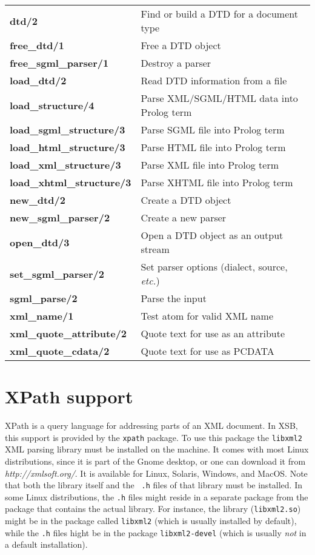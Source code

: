\begin{longtable}[l]{ll}
  {\bf dtd/2}&Find or build a DTD for a document type\\
  {\bf free\_dtd/1}&Free a DTD object\\
  {\bf free\_sgml\_parser/1}&Destroy a parser\\
  {\bf load\_dtd/2}&Read DTD information from a file\\
  {\bf load\_structure/4}&Parse XML/SGML/HTML data into Prolog term\\
  {\bf load\_sgml\_structure/3}&Parse SGML file into Prolog term \\
  {\bf load\_html\_structure/3}&Parse HTML file into Prolog term\\
  {\bf load\_xml\_structure/3}&Parse XML file into Prolog term\\
  {\bf load\_xhtml\_structure/3}&Parse XHTML file into Prolog term\\
  {\bf new\_dtd/2}&Create a DTD object\\
  {\bf new\_sgml\_parser/2}&Create a new parser\\
  {\bf open\_dtd/3}&Open a DTD object as an output stream\\
  {\bf set\_sgml\_parser/2}&Set parser options (dialect, source, \emph{etc.})\\
  {\bf sgml\_parse/2}&Parse the input\\
  {\bf xml\_name/1}&Test atom for valid XML name\\
  {\bf xml\_quote\_attribute/2}&Quote text for use as an attribute\\
  {\bf xml\_quote\_cdata/2}&Quote text for use as PCDATA\\

\end{longtable}


\section{XPath support}\label{sec-xpath}

XPath is a query language for addressing parts of an XML document.
In XSB, this support is provided by the {\tt xpath} package.
To use this package the {\tt libxml2} XML parsing library must be installed
on the machine. It comes with most Linux distributions, since it is part of
the Gnome desktop, or one can download
it from \emph{http://xmlsoft.org/}. It is available for Linux, Solaris,
Windows, and MacOS. Note that both the library itself and the {\tt
  .h} files of that library must be installed. In some Linux distributions,
the {\tt .h} files might reside in a separate package
from the package that contains the actual library. For instance, the
library ({\tt libxml2.so})  might be in the package called {\tt libxml2}
(which is usually installed by default),
while the {\tt .h} files hight be in the package {\tt libxml2-devel}
(which is usually \emph{not} in a default installation).

